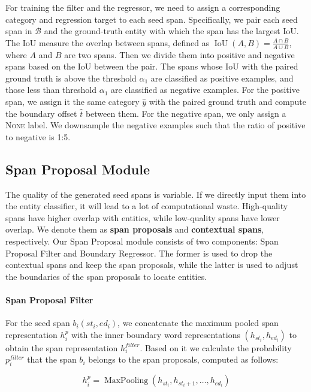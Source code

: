 \documentclass[11pt,a4paper]{article}
\begin{document}
For training the filter and the regressor, we need to assign a corresponding category and regression target to each seed span. Specifically, we pair each seed span in $\mathcal{B}$ and the ground-truth entity with which the span has the largest IoU. The IoU measure the overlap between spans, defined as $ \operatorname{IoU}(A, B) =\frac{A\cap B}{A\cup B}$, where $A$ and $B$ are two spans. Then we divide them into positive and negative spans based on the IoU between the pair. The spans whose IoU with the paired ground truth is above the threshold $\alpha_1$ are classified as positive examples, and those less than threshold $\alpha_1$ are classified as negative examples. For the positive span, we assign it the same category $\hat{y}$ with the paired ground truth and compute the boundary offset $\hat{t}$ between them. For the negative span, we only assign a \textsc{None} label. We downsample the negative examples such that the ratio of positive to negative is 1:5.




\subsection{Span Proposal Module}

The quality of the generated seed spans is variable. If we directly input them into the entity classifier, it will lead to a lot of computational waste. High-quality spans have higher overlap with entities, while low-quality spans have lower overlap. We denote them as \textbf{span proposals} and \textbf{contextual spans}, respectively. Our Span Proposal module consists of two components: Span Proposal Filter and Boundary Regressor. The former is used to drop the contextual spans and keep the span proposals, while the latter is used to adjust the boundaries of the span proposals to locate entities.


\paragraph{Span Proposal Filter}

For the seed span $b_i(st_i, ed_i)$, we concatenate the maximum pooled span representation $h^p_i$ with the inner boundary word representations $(h_{st_i}, h_{ed_i})$ to obtain the span representation $h^{filter}_i$. 
Based on it we calculate the probability $p^{filter}_i$ that the span $b_i$ belongs to the span proposals, computed as follows:

\begin{equation}
    h^p_i = \operatorname{MaxPooling}(h_{st_i}, h_{st_i+1}, \dots, h_{ed_i})
\end{equation}
\end{document}
